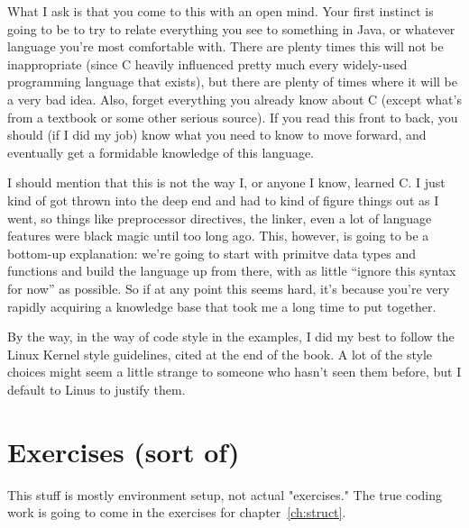 \documentclass[ebook,11pt,oneside,openany]{memoir}
\begin{document}
What I ask is that you come to this with an open mind. Your first instinct is going to be to try to relate everything you see to something in Java, or whatever language you're most comfortable with. There are plenty times this will not be inappropriate (since C heavily influenced pretty much every widely-used programming language that exists), but there are plenty of times where it will be a very bad idea.  Also, forget everything you already know about C (except what's from a textbook or some other serious source). If you read this front to back, you should (if I did my job) know what you need to know to move forward, and eventually get a formidable knowledge of this language.

I should mention that this is not the way I, or anyone I know, learned C. I just kind of got thrown into the deep end and had to kind of figure things out as I went, so things like preprocessor directives, the linker, even a lot of language features were black magic until too long ago. This, however, is going to be a bottom-up explanation: we're going to start with primitve data types and functions and build the language up from there, with as little ``ignore this syntax for now'' as possible. So if at any point this seems hard, it's because you're very rapidly acquiring a knowledge base that took me a long time to put together.

By the way, in the way of code style in the examples, I did my best to follow the Linux Kernel style guidelines, cited at the end of the book. A lot of the style choices might seem a little strange to someone who hasn't seen them before, but I default to Linus to justify them.


\section*{Exercises (sort of)}

This stuff is mostly environment setup, not actual "exercises." The true coding work is going to come in the exercises for chapter~\ref{ch:struct}.
\end{document}
